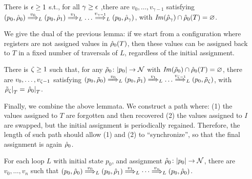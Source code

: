 %
\begin{lemma}
There is $\epsilon \geq 1$ s.t., for all $\gamma \geq \epsilon$ ,there are $v_0,\dots,v_{\gamma-1}$ satisfying $(p_0,\hat{\rho}_0) \overset{v_0}{\Longrightarrow}_{L} (p_0,\hat{\rho}_1) \overset{v_1}{\Longrightarrow}_{L} \dots \overset{v_{\gamma-1}}{\Longrightarrow}_{L} (p_0,\hat{\rho}_\gamma)$, with $\mathit{Im}(\hat{\rho}_\gamma) \cap \hat{\rho}_0(T) = \varnothing$.
\label{lem:forgetT}
\end{lemma}
%
%
We give the dual of the previous lemma: if we start from a configuration where registers are not assigned values in $\hat{\rho}_0(T)$, then these values can be assigned back to $T$ in a fixed number of traversals of $L$, regardless of the initial assignment.

\begin{lemma}
There is $\zeta \geq 1$ such that,
for any $\tilde{\rho}_0 \colon |p_0| \to \mathcal{N}$ with $\mathit{Im}(\tilde{\rho}_0) \cap \hat{\rho}_0(T) = \varnothing$, there are $v_0,\dots,v_{\zeta-1}$ satisfying $ (p_0,\tilde{\rho}_0) \overset{v_0}{\Longrightarrow}_{L} (p_0,\tilde{\rho}_1) \overset{v_1}{\Longrightarrow}_{L} \dots \overset{v_{\zeta-1}}{\Longrightarrow}_{L} (p_0,\tilde{\rho}_\zeta)$, with $\left.\tilde{\rho}_\zeta\right|_{T} = \left.\hat{\rho}_0\right|_{T}$.
\label{lem:initT}
\end{lemma}
%
%
Finally, we combine the above lemmata. We construct a path where: (1) the values assigned to $T$ are forgotten and then recovered (2) the values assigned to $I$ are swapped, but the initial assignment is periodically regained. Therefore, the length of such path should allow (1) and (2) to ``synchronize'', so that the final assignment is again $\hat{\rho}_0$.

\begin{theorem}
\label{thm:loop}
%
%
For each loop $L$ with initial state $p_0$, and assignment $\hat{\rho}_0 \colon |p_0| \to \mathcal{N}$, there are $v_0,\dots,v_n$ such that
$	(p_0, \hat{\rho}_0) \overset{v_0}{\Longrightarrow}_{L} (p_0, \hat{\rho}_1) \overset{v_1}{\Longrightarrow}_{L} \cdots \overset{v_n}{\Longrightarrow}_{L} (p_0,\hat{\rho}_0) $.
\end{theorem}

%

